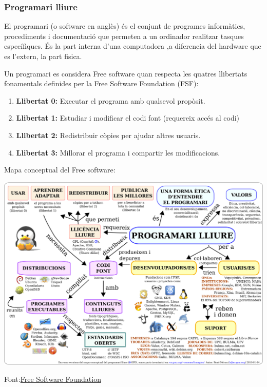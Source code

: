 \subsubsection{Programari lliure}

El programari (o software en anglès) és el conjunt de programes informàtics, procediments i documentació que permeten a un ordinador realitzar tasques específiques. És la part interna d'una computadora ,a diferencia del hardware que es l'extern, la part fisica.

Un programari es considera Free software quan respecta les quatres llibertats fonamentals definides per la Free Software Foundation (FSF):
\begin{enumerate}
 \item  \textbf{Llibertat 0:} Executar el programa amb qualsevol propòsit.
 \item  \textbf{Llibertat 1:} Estudiar i modificar el codi font (requereix accés al codi)
 \item  \textbf{Llibertat 2:} Redistribuir còpies per ajudar altres usuaris.
 \item  \textbf{Llibertat 3:} Millorar el programa i compartir les modificacions.
\end{enumerate}

Mapa conceptual del Free software:
\begin{center}
\hspace{-27mm}
 \includegraphics[scale=0.1]{./figures/mapa.png}
\end{center}

Font:\href{https://www.fsf.org/}{Free Software Foundation}

